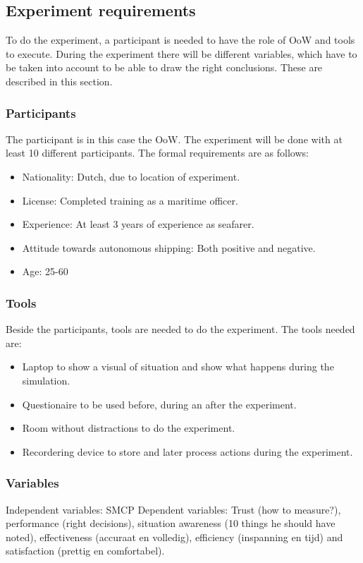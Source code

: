 \subsection{Experiment requirements}
To do the experiment, a participant is needed to have the role of \acf{OoW} and tools to execute. During the experiment there will be different variables, which have to be taken into account to be able to draw the right conclusions. These are described in this section.

\subsubsection{Participants}
The participant is in this case the \acf{OoW}. The experiment will be done with at least 10 different participants. The formal requirements are as follows:
\begin{itemize}
	\item Nationality: Dutch, due to location of experiment.
	\item License: Completed training as a maritime officer.
	\item Experience: At least 3 years of experience as seafarer.
	\item Attitude towards autonomous shipping: Both positive and negative.
	\item Age: 25-60
\end{itemize}

\subsubsection{Tools}
Beside the participants, tools are needed to do the experiment. The tools needed are:
\begin{itemize}
	\item Laptop to show a visual of situation and show what happens during the simulation.
	\item Questionaire to be used before, during an after the experiment.
	\item Room without distractions to do the experiment.
	\item Recordering device to store and later process actions during the experiment.
\end{itemize}

\subsubsection{Variables}
Independent variables: SMCP
Dependent variables: Trust (how to measure?), performance (right decisions), situation awareness (10 things he should have noted), effectiveness (accuraat en volledig), efficiency (inspanning en tijd) and satisfaction (prettig en comfortabel). 

